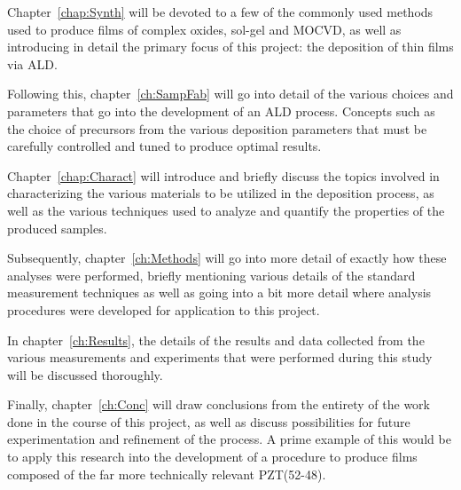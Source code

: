 Chapter~\ref{chap:Synth} will be devoted to a few of the commonly used methods used to produce films of complex oxides, sol-gel and MOCVD, as well as introducing in detail the primary focus of this project: the deposition of thin films via ALD. 

Following this, chapter~\ref{ch:SampFab} will go into detail of the various choices and parameters that go into the development of an ALD process. Concepts such as the choice of precursors from the various deposition parameters that must be carefully controlled and tuned to produce optimal results. 

Chapter~\ref{chap:Charact} will introduce and briefly discuss the topics involved in characterizing the various materials to be utilized in the deposition process, as well as the various techniques used to analyze and quantify the properties of the produced samples. 

Subsequently, chapter~\ref{ch:Methods} will go into more detail of exactly how these analyses were performed, briefly mentioning various details of the standard measurement techniques as well as going into a bit more detail where analysis procedures were developed for application to this project. 

In chapter~\ref{ch:Results}, the details of the results and data collected from the various measurements and experiments that were performed during this study will be discussed thoroughly.  

Finally, chapter~\ref{ch:Conc} will draw conclusions from the entirety of the work done in the course of this project, as well as discuss possibilities for future experimentation and refinement of the process. A prime example of this would be to apply this research into the development of a procedure to produce films composed of the far more technically relevant PZT(52-48). 


%
